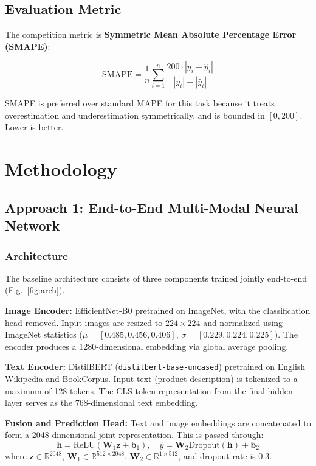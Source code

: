 \documentclass[conference]{IEEEtran}
\begin{document}
\subsection{Evaluation Metric}
The competition metric is \textbf{Symmetric Mean Absolute Percentage Error (SMAPE)}:

\begin{equation}
\text{SMAPE} = \frac{1}{n} \sum_{i=1}^{n} \frac{200 \cdot |y_i - \hat{y}_i|}{|y_i| + |\hat{y}_i|}
\end{equation}

SMAPE is preferred over standard MAPE for this task because it treats overestimation and underestimation symmetrically, and is bounded in $[0, 200]$. Lower is better.

\section{Methodology}

\subsection{Approach 1: End-to-End Multi-Modal Neural Network}

\subsubsection{Architecture}
The baseline architecture consists of three components trained jointly end-to-end (Fig.~\ref{fig:arch}).

\textbf{Image Encoder:} EfficientNet-B0 pretrained on ImageNet, with the classification head removed. Input images are resized to $224 \times 224$ and normalized using ImageNet statistics ($\mu = [0.485, 0.456, 0.406]$, $\sigma = [0.229, 0.224, 0.225]$). The encoder produces a 1280-dimensional embedding via global average pooling.

\textbf{Text Encoder:} DistilBERT (\texttt{distilbert-base-uncased}) pretrained on English Wikipedia and BookCorpus. Input text (product description) is tokenized to a maximum of 128 tokens. The CLS token representation from the final hidden layer serves as the 768-dimensional text embedding.

\textbf{Fusion and Prediction Head:} Text and image embeddings are concatenated to form a 2048-dimensional joint representation. This is passed through:
\begin{equation}
\mathbf{h} = \text{ReLU}(\mathbf{W}_1 \mathbf{z} + \mathbf{b}_1), \quad \hat{y} = \mathbf{W}_2 \text{Dropout}(\mathbf{h}) + \mathbf{b}_2
\end{equation}
where $\mathbf{z} \in \mathbb{R}^{2048}$, $\mathbf{W}_1 \in \mathbb{R}^{512 \times 2048}$, $\mathbf{W}_2 \in \mathbb{R}^{1 \times 512}$, and dropout rate is 0.3.
\end{document}
